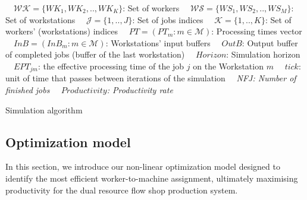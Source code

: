 \documentclass[review,12pt, 3p, times]{elsarticle}
\begin{document}
\begin{algorithm2e}[H]  
  \scriptsize
	\KwData{}	 
	\ \ $\mathcal{WK}=\{WK_1, WK_2,.., WK_K\}$: Set of workers\;
	\ \ $\mathcal{WS}=\{WS_1,WS_2,..,WS_M\}$: Set of workstations\;
	\ \ $\mathcal{J}=\{1,..,J\}$: Set of jobs indices\;
	\ \ $\mathcal{K}=\{1,..,K\}$: Set of workers' (workstations) indices\;
	\ \ $PT=(PT_{m}:  m\in\mathcal{M})$: Processing times vector\;
	\ \ $InB=(InB_m: m\in\mathcal{M})$: Workstations' input buffers\;
	\ \ $OutB$: Output buffer of completed jobs (buffer of the last workstation)\;
	\ \ $Horizon$: Simulation horizon\;
	\ \  $EPT_{jm}$: the effective processing time of the job $j$ on the Workstation $m$ \;
	\ \ $tick$: unit of time that passes between iterations of the simulation \;
	\KwResult{}
	\ \ \it{NFJ}: Number of finished jobs  \; 
	\ \ $Productivity$: Productivity rate  \;
	\caption{Simulation algorithm}
            \label{algo:algorithmsimulator}
\end{algorithm2e}	   

        
				
\subsection{Optimization model}\label{sec:Pre_mod}
In this section, we introduce our non-linear optimization model designed to identify the most efficient worker-to-machine assignment, ultimately maximising productivity for the dual resource flow shop production system. 
	
\end{document}
